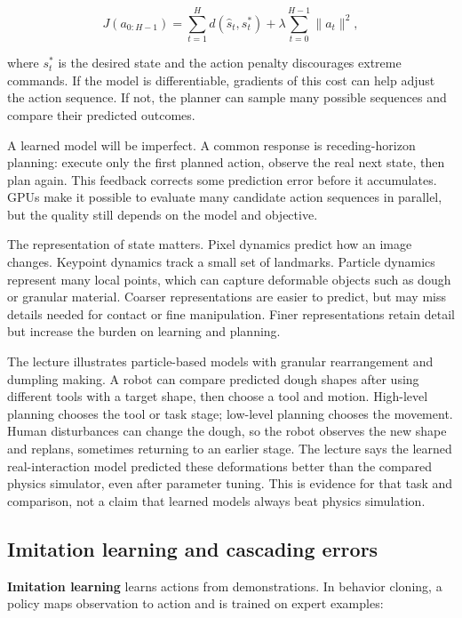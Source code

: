 \[
J(a_{0:H-1})=\sum_{t=1}^{H} d(\hat{s}_t,s^*_t)+\lambda\sum_{t=0}^{H-1}\|a_t\|^2,
\]

where \(s^*_t\) is the desired state and the action penalty discourages extreme commands. If the model is differentiable, gradients of this cost can help adjust the action sequence. If not, the planner can sample many possible sequences and compare their predicted outcomes.

A learned model will be imperfect. A common response is receding-horizon planning: execute only the first planned action, observe the real next state, then plan again. This feedback corrects some prediction error before it accumulates. GPUs make it possible to evaluate many candidate action sequences in parallel, but the quality still depends on the model and objective.

The representation of state matters. Pixel dynamics predict how an image changes. Keypoint dynamics track a small set of landmarks. Particle dynamics represent many local points, which can capture deformable objects such as dough or granular material. Coarser representations are easier to predict, but may miss details needed for contact or fine manipulation. Finer representations retain detail but increase the burden on learning and planning.

The lecture illustrates particle-based models with granular rearrangement and dumpling making. A robot can compare predicted dough shapes after using different tools with a target shape, then choose a tool and motion. High-level planning chooses the tool or task stage; low-level planning chooses the movement. Human disturbances can change the dough, so the robot observes the new shape and replans, sometimes returning to an earlier stage. The lecture says the learned real-interaction model predicted these deformations better than the compared physics simulator, even after parameter tuning. This is evidence for that task and comparison, not a claim that learned models always beat physics simulation.

\subsection{Imitation learning and cascading errors}\label{04-visual-computing-ii-ch034-imitation-learning-and-cascading-errors}

\hypertarget{04-visual-computing-ii-ch034-imitation-learning-and-cascading-errors}{}

\textbf{Imitation learning} learns actions from demonstrations. In behavior cloning, a policy maps observation to action and is trained on expert examples:


